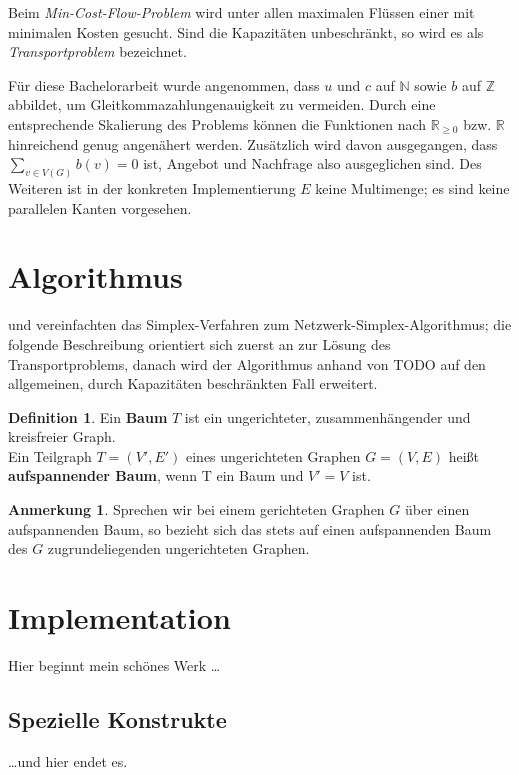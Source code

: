 \documentclass[a4paper,twoside]{report}
\theoremstyle{plain}
\theoremstyle{definition}
\newtheorem{defn}[thm]{Definition}
\newtheorem*{anm}{Anmerkung}
\begin{document}
Beim \emph{Min-Cost-Flow-Problem} wird unter allen maximalen Flüssen einer mit minimalen Kosten gesucht. Sind die Kapazitäten unbeschränkt, so wird es als \emph{Transportproblem} bezeichnet.

Für diese Bachelorarbeit wurde angenommen, dass $u$ und $c$ auf $\mathbb{N}$ sowie $b$ auf $\mathbb{Z}$ abbildet, um Gleitkommazahlungenauigkeit zu vermeiden. Durch eine entsprechende Skalierung des Problems können die Funktionen nach $\mathbb{R}_{\geq 0}$ bzw. $\mathbb{R}$ hinreichend genug angenähert werden. Zusätzlich wird davon ausgegangen, dass $\sum_{v\in V(G)} b(v) = 0$ ist, Angebot und Nachfrage also ausgeglichen sind. Des Weiteren ist in der konkreten Implementierung $E$ keine Multimenge; es sind keine parallelen Kanten vorgesehen.

\section{Algorithmus}
\cite[Dantzig, 1951]{erf1} und \cite[Orden, 1956]{erf2} vereinfachten das Simplex-Verfahren zum Netzwerk-Simplex-Algorithmus; die folgende Beschreibung orientiert sich zuerst an \cite[S. 291\,ff.]{NSAbook} zur Lösung des Transportproblems, danach wird der Algorithmus anhand von TODO auf den allgemeinen, durch Kapazitäten beschränkten Fall erweitert.

\begin{defn}Ein \textbf{Baum} $T$ ist ein ungerichteter, zusammenhängender und kreisfreier Graph.\\
Ein Teilgraph $T=(V',E')$ eines ungerichteten Graphen $G=(V,E)$ heißt \textbf{aufspannender Baum}, wenn T ein Baum und $V'=V$ ist.\end{defn}
\begin{anm}Sprechen wir bei einem gerichteten Graphen $G$ über einen aufspannenden Baum, so bezieht sich das stets auf einen aufspannenden Baum des $G$ zugrundeliegenden ungerichteten Graphen.\end{anm}




\section{Implementation} \label{prog}
Hier beginnt mein schönes Werk \ldots

\subsection{Spezielle Konstrukte}
\ldots und hier endet es.
\end{document}
